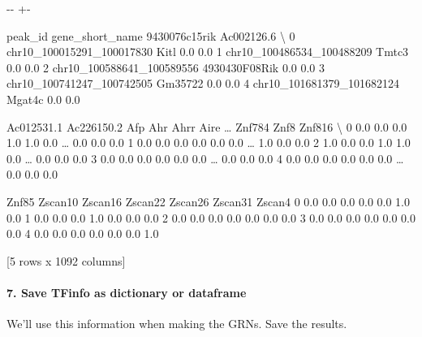 \documentclass[letterpaper,10pt,english]{sphinxmanual}
\newlength\nbsphinxcodecellspacing
\begin{document}
{

\kern-\sphinxverbatimsmallskipamount\kern-\baselineskip
\kern+\FrameHeightAdjust\kern-\fboxrule
\vspace{\nbsphinxcodecellspacing}

\begin{sphinxVerbatim}[commandchars=\\\{\}]
\llap{\color{nbsphinxout}[17]:\,\hspace{\fboxrule}\hspace{\fboxsep}}                     peak\_id gene\_short\_name  9430076c15rik  Ac002126.6  \textbackslash{}
0  chr10\_100015291\_100017830            Kitl            0.0         0.0
1  chr10\_100486534\_100488209           Tmtc3            0.0         0.0
2  chr10\_100588641\_100589556   4930430F08Rik            0.0         0.0
3  chr10\_100741247\_100742505         Gm35722            0.0         0.0
4  chr10\_101681379\_101682124          Mgat4c            0.0         0.0

   Ac012531.1  Ac226150.2  Afp  Ahr  Ahrr  Aire  {\ldots}  Znf784  Znf8  Znf816  \textbackslash{}
0         0.0         0.0  0.0  1.0   1.0   0.0  {\ldots}     0.0   0.0     0.0
1         0.0         0.0  0.0  0.0   0.0   0.0  {\ldots}     1.0   0.0     0.0
2         1.0         0.0  0.0  1.0   1.0   0.0  {\ldots}     0.0   0.0     0.0
3         0.0         0.0  0.0  0.0   0.0   0.0  {\ldots}     0.0   0.0     0.0
4         0.0         0.0  0.0  0.0   0.0   0.0  {\ldots}     0.0   0.0     0.0

   Znf85  Zscan10  Zscan16  Zscan22  Zscan26  Zscan31  Zscan4
0    0.0      0.0      0.0      0.0      0.0      1.0     0.0
1    0.0      0.0      0.0      1.0      0.0      0.0     0.0
2    0.0      0.0      0.0      0.0      0.0      0.0     0.0
3    0.0      0.0      0.0      0.0      0.0      0.0     0.0
4    0.0      0.0      0.0      0.0      0.0      0.0     1.0

[5 rows x 1092 columns]
\end{sphinxVerbatim}
}


\paragraph{7. Save TFinfo as dictionary or dataframe}
\label{\detokenize{notebooks/02_motif_scan/02_atac_peaks_to_TFinfo_with_celloracle_20200801:7.-Save-TFinfo-as-dictionary-or-dataframe}}
We’ll use this information when making the GRNs. Save the results.
\end{document}
